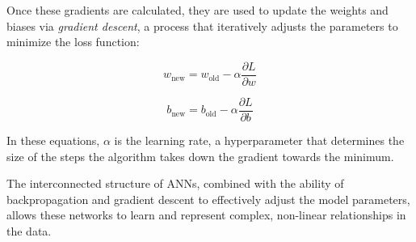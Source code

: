 Once these gradients are calculated, they are used to update the weights and biases via \textit{gradient descent}, a process that iteratively adjusts the parameters to minimize the loss function:

\[
w_{\text{new}} = w_{\text{old}} - \alpha \frac{\partial L}{\partial w}
\]

\[
b_{\text{new}} = b_{\text{old}} - \alpha \frac{\partial L}{\partial b}
\]

In these equations, $ \alpha $ is the learning rate, a hyperparameter that determines the size of the steps the algorithm takes down the gradient towards the minimum.

The interconnected structure of ANNs, combined with the ability of backpropagation and gradient descent to effectively adjust the model parameters, allows these networks to learn and represent complex, non-linear relationships in the data.
